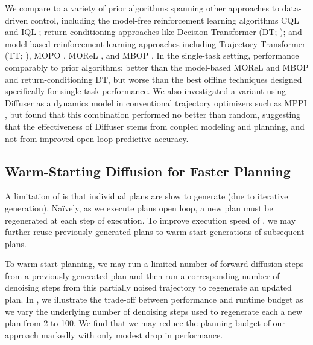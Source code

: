 We compare to a variety of prior algorithms spanning other approaches to data-driven control, including the model-free reinforcement learning algorithms CQL \citep{kumar2020conservative} and IQL \citep{kostrikov2021implicit}; return-conditioning approaches like Decision Transformer (DT; \citealt{chen2021decision}); and model-based reinforcement learning approaches including Trajectory Transformer (TT; \citealt{janner2021sequence}), MOPO \citep{yu2020mopo}, MOReL \citep{kidambi2020morel}, and MBOP \citep{argenson2020model}.
In the single-task setting, \method performance comparably to prior algorithms: better than the model-based MOReL and MBOP and return-conditioning DT, but worse than the best offline techniques designed specifically for single-task performance.
We also investigated a variant using Diffuser as a dynamics model in conventional trajectory optimizers such as MPPI \citep{grady2015mppi}, but found that this combination performed no better than random, suggesting that the effectiveness of Diffuser stems from coupled modeling and planning, and not from improved open-loop predictive accuracy.



\subsection{Warm-Starting Diffusion for Faster Planning}

A limitation of \method{} is that individual plans are slow to generate (due to iterative generation). Na\"ively,  as we execute plans open loop, a new plan must be regenerated at each step of execution. To improve execution speed of \method{}, we may further reuse previously generated plans to warm-start generations of subsequent plans. 

To warm-start planning, we may run a limited number of forward diffusion steps from a previously generated plan and then run a corresponding number of denoising steps from this partially noised trajectory to regenerate an updated plan. In , we illustrate the trade-off between performance and runtime budget as we vary the underlying number of denoising steps used to regenerate each a new plan from 2 to 100. We find that we may reduce the planning budget of our approach markedly with only modest drop in performance.

